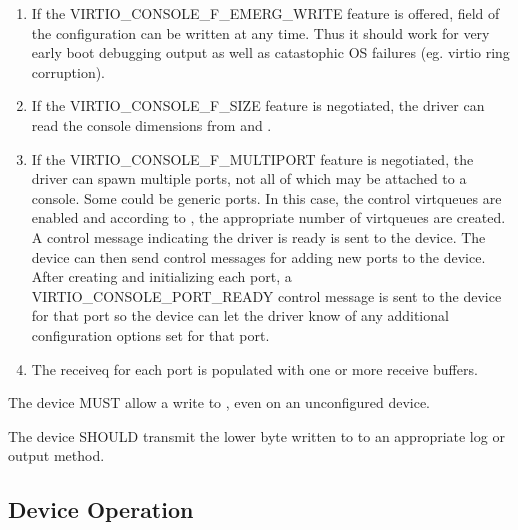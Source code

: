 \begin{enumerate}
\item If the VIRTIO_CONSOLE_F_EMERG_WRITE feature is offered,
   field of the configuration can be written at any time.
  Thus it should work for very early boot debugging output as well as
  catastophic OS failures (eg. virtio ring corruption).

\item If the VIRTIO_CONSOLE_F_SIZE feature is negotiated, the driver
  can read the console dimensions from  and .

\item If the VIRTIO_CONSOLE_F_MULTIPORT feature is negotiated, the
  driver can spawn multiple ports, not all of which may be
  attached to a console. Some could be generic ports. In this
  case, the control virtqueues are enabled and according to
  , the appropriate number
  of virtqueues are created. A control message indicating the
  driver is ready is sent to the device. The device can then send
  control messages for adding new ports to the device. After
  creating and initializing each port, a
  VIRTIO_CONSOLE_PORT_READY control message is sent to the device
  for that port so the device can let the driver know of any additional
  configuration options set for that port.

\item The receiveq for each port is populated with one or more
  receive buffers.
\end{enumerate}


The device MUST allow a write to , even on an
unconfigured device.

The device SHOULD transmit the lower byte written to  to
an appropriate log or output method.

\subsection{Device Operation}\label{sec:Device Types / Console Device / Device Operation}


